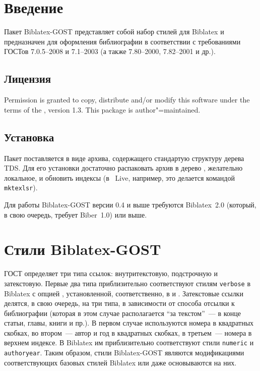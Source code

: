 \documentclass[10pt,a4paper,headings=small,numbers=enddot,english,russian]{ltxdockit}[2011/03/25]
\newcommand*{\biber}{Biber\xspace}
\newcommand*{\biblatex}{Biblatex\xspace}
\newcommand*{\biblatexgost}{\biblatex-GOST\xspace}
\newcommand*{\bibsty}{\texttt}
\newcommand*{\gostcitename}[1][]{ГОСТ#1 7.0.5--2008}
\begin{document}
\printtitlepage
\tableofcontents
\listoftables

\section{Введение}
\label{sec:int}

Пакет \biblatexgost{} представляет 
собой набор стилей для \biblatex{} 
и предназначен для оформления библиографии в соответствии с требованиями \gostcitename[ов] и 
7.1--2003 (а также 7.80--2000, 7.82--2001 и др.). 

\subsection{Лицензия}
\label{sec:lic}

Permission is granted to copy, distribute and\slash or modify this software under the terms of the \lppl, version 1.3. This package is author"=maintained.

\subsection{Установка}
\label{sec:install}

Пакет поставляется в виде архива, содержащего стандартую структуру дерева TDS. 
Для его установки достаточно распаковать архив в дерево \tex, желательно локальное, и 
обновить индексы (в \tex~Live, например, это делается командой \texttt{mktexlsr}).

Для работы \biblatexgost версии 0.4 и выше требуются 
\biblatex~2.0 
(который, в свою очередь, требует
\biber~1.0) 
или выше.

\section{Стили \biblatexgost}
\label{sec:styles}

ГОСТ определяет три типа ссылок: внутритекстовую, подстрочную и затекстовую.
Первые два типа приблизительно соответствуют стилям \bibsty{verbose} в \biblatex 
с опцией , установленной, соответственно, в  и 
. Затекстовые ссылки делятся, в свою очередь, на три типа, в зависимости 
от способа отсылки к библиографии (которая в этом случае располагается 
\enquote{за текстом}~--- в конце статьи, главы, книги и пр.). 
В первом случае используются номера в квадратных скобках, во 
втором~--- автор и год в квадратных скобках, в третьем~--- номера в верхнем индексе. 
В \biblatex им приблизительно 
соответствуют стили \bibsty{numeric} и \bibsty{authoryear}. Таким образом, 
стили \biblatexgost являются модификациями соответствующих базовых стилей 
\biblatex или даже основываются на них. 
\end{document}
